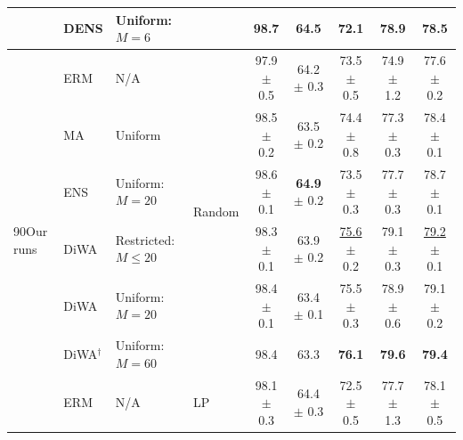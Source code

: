 \begin{table}[h]
{\begin{tabular}{llll|ccccc}
             & DENS \cite{Lakshminarayanan2017,arpit2021ensemble} & Uniform: $M=6$            &                                                & 98.7                       & 64.5                    & 72.1                       & 78.9                       & 78.5                       \\
            \midrule
            \multirow{13}{*}{\begin{turn}{90}Our runs\end{turn}}
             & ERM                                                & N/A                       & \multirow{6}{*}{Random}                        & 97.9 $\pm$ 0.5             & 64.2 $\pm$ 0.3          & 73.5 $\pm$ 0.5             & 74.9 $\pm$ 1.2             & 77.6 $\pm$ 0.2             \\
             & MA \cite{arpit2021ensemble}                        & Uniform                   &                                                & 98.5 $\pm$ 0.2             & 63.5 $\pm$ 0.2          & 74.4 $\pm$ 0.8             & 77.3 $\pm$ 0.3             & 78.4 $\pm$ 0.1             \\
             & ENS                                                & Uniform: $M=20$           &                                                & 98.6 $\pm$ 0.1             & \textbf{64.9} $\pm$ 0.2 & 73.5 $\pm$ 0.3             & 77.7 $\pm$ 0.3             & 78.7 $\pm$ 0.1             \\
             & DiWA                                               & Restricted: $M \leq 20$   &                                                & 98.3 $\pm$ 0.1             & 63.9 $\pm$ 0.2          & \underline{75.6} $\pm$ 0.2 & 79.1 $\pm$ 0.3             & \underline{79.2} $\pm$ 0.1 \\
             & DiWA                                               & Uniform: $M=20$           &                                                & 98.4 $\pm$ 0.1             & 63.4 $\pm$ 0.1          & 75.5 $\pm$ 0.3             & 78.9 $\pm$ 0.6             & 79.1 $\pm$ 0.2             \\
             & DiWA$^{\dagger}$                                   & Uniform: $M=60$           &                                                & 98.4                       & 63.3                    & \textbf{76.1}              & \textbf{79.6}              & \textbf{79.4}              \\
            \cmidrule{2-9}
             & ERM                                                & N/A                       & \multirow{7}{*}{LP \cite{kumar2022finetuning}} & 98.1 $\pm$ 0.3             & 64.4 $\pm$ 0.3          & 72.5 $\pm$ 0.5             & 77.7 $\pm$ 1.3             & 78.1 $\pm$ 0.5             \\

\end{tabular}}
\end{table}
